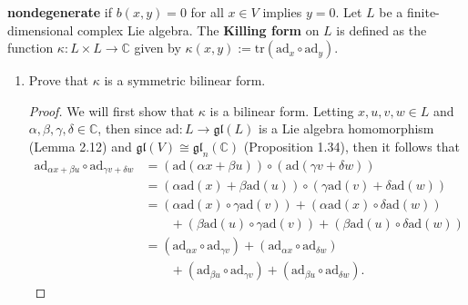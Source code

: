 \documentclass[12pt]{article}
\theoremstyle{definition}
\begin{document}
\begin{enumerate}
            \textbf{nondegenerate} if $b(x, y)=0$ for all $x\in V$ implies
            $y=0$. Let $L$ be a finite-dimensional complex Lie algebra. The
            \textbf{Killing form} on $L$ is defined as the function
            $\kappa:L\times L\to\mathbb{C}$ given by $\kappa(x,
            y):=\text{tr}(\text{ad}_x\circ\text{ad}_y)$.
            \begin{enumerate}[label=(\alph*)]
                \item Prove that $\kappa$ is a symmetric bilinear form.
                    \begin{proof}
                        We will first show that $\kappa$ is a bilinear form.
                        Letting $x, u, v, w\in L$ and $\alpha, \beta, \gamma,
                        \delta\in\mathbb{C}$, then since
                        $\text{ad}:L\to\mathfrak{gl}(L)$ is a Lie algebra
                        homomorphism (Lemma 2.12) and
                        $\mathfrak{gl}(V)\cong\mathfrak{gl}_n(\mathbb{C})$
                        (Proposition 1.34),
                        then it follows that
                        \begin{equation*}
                            \begin{split}
                                \text{ad}_{\alpha x+\beta
                                u}\circ\text{ad}_{\gamma v+\delta w}
                                &=(\text{ad}(\alpha x+\beta
                                u))\circ(\text{ad}(\gamma v+\delta w)) \\
                                &=(\alpha\text{ad}(x)+\beta\text{ad}(u))\circ(\gamma\text{ad}(v)+\delta\text{ad}(w))
                                \\
                                &=(\alpha\text{ad}(x)\circ\gamma\text{ad}(v))
                                +(\alpha\text{ad}(x)\circ\delta\text{ad}(w))\\&\quad\quad
                                +(\beta\text{ad}(u)\circ\gamma\text{ad}(v))
                                +(\beta\text{ad}(u)\circ\delta\text{ad}(w)) \\
                                &=(\text{ad}_{\alpha x}\circ\text{ad}_{\gamma
                                v})+(\text{ad}_{\alpha x}\circ\text{ad}_{\delta
                                w})\\&\quad\quad+(\text{ad}_{\beta
                                u}\circ\text{ad}_{\gamma v})+(\text{ad}_{\beta
                                u}\circ\text{ad}_{\delta w}).
                            \end{split}

\end{equation*}
\end{proof}
\end{enumerate}
\end{enumerate}
\end{document}
